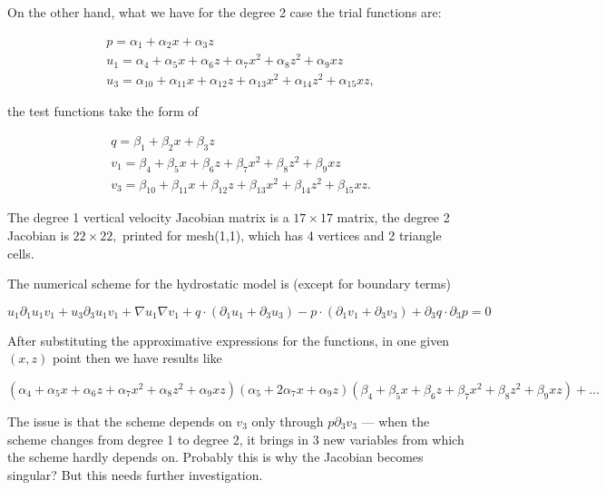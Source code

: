 \documentclass[11pt]{article}
\begin{document}
On the other hand, what we have for the degree 2 case the trial functions are:

\begin{equation}
  \begin{split}
    & p = \alpha_1 + \alpha_2 x + \alpha_3 z \\
    & u_1 = \alpha_4 + \alpha_5 x + \alpha_6 z + \alpha_7 x^2 + \alpha_8 z^2 + \alpha_9 xz \\
    & u_3 = \alpha_{10} + \alpha_{11} x + \alpha_{12} z + \alpha_{13} x^2 + \alpha_{14} z^2 + \alpha_{15} xz,
  \end{split}
\end{equation}

the test functions take the form of

\begin{equation}
  \begin{split}
    & q = \beta_1 + \beta_2 x + \beta_3 z \\
    & v_1 = \beta_4 + \beta_5 x + \beta_6 z + \beta_7 x^2 + \beta_8 z^2 + \beta_9 xz \\
    & v_3 = \beta_{10} + \beta_{11} x + \beta_{12} z + \beta_{13} x^2 + \beta_{14} z^2 + \beta_{15} xz.
  \end{split}
\end{equation}

The degree 1 vertical velocity Jacobian matrix is a $17 \times 17$ matrix, the degree 2 Jacobian is $22 \times 22,$ printed for mesh(1,1), which has 4 vertices and 2 triangle cells.

The numerical scheme for the hydrostatic model is (except for boundary terms)

$$ u_1 \partial_1 u_1 v_1 + u_3 \partial_3 u_1 v_1 + \nabla u_1 \nabla v_1 + q\cdot (\partial_1 u_1 + \partial_3 u_3) - p \cdot (\partial_1 v_1 + \partial_3 v_3) + \partial_3 q \cdot \partial_3 p = 0$$

After substituting the approximative expressions for the functions, in one given $(x,z)$ point then we have results like

$(\alpha_4 + \alpha_5 x + \alpha_6 z + \alpha_7 x^2 + \alpha_8 z^2 + \alpha_9 xz) (\alpha_5 + 2 \alpha_7 x + \alpha_9 z) (\beta_4 + \beta_5 x + \beta_6 z + \beta_7 x^2 + \beta_8 z^2 + \beta_9 xz) + ... $

The issue is that the scheme depends on $v_3$ only through $p \partial_3 v_3$ --- when the scheme changes from degree 1 to degree 2, it brings in 3 new variables from which the scheme hardly depends on. Probably this is why the Jacobian becomes singular? But this needs further investigation.
\end{document}
